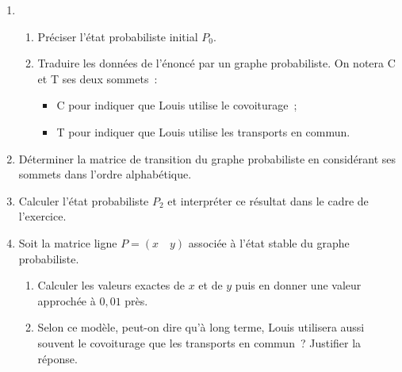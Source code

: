 \begin{enumerate}
     \item
     \begin{enumerate}[label=\alph*.]
          \item Préciser l'état probabiliste initial $P_0$.
          \item Traduire les données de l'énoncé par un graphe probabiliste.
          On notera \og C \fg{} et \og T \fg{} ses deux sommets~:
          \begin{itemize}
               \item \og C\fg{} pour indiquer que Louis utilise le covoiturage~;
               \item \og T\fg{} pour indiquer que Louis utilise les transports en commun.
          \end{itemize}
     \end{enumerate}
     \item  Déterminer la matrice de transition du graphe probabiliste en considérant ses sommets dans
     l'ordre alphabétique.
     \item  Calculer l'état probabiliste $P_2$ et interpréter ce résultat dans le cadre de l'exercice.
     \item  Soit la matrice ligne $P = (x \quad y)$ associée à l'état stable du graphe probabiliste.
     \begin{enumerate}[label=\alph*.]
          \item Calculer les valeurs exactes de $x$ et de $y$ puis en donner une valeur approchée à $0,01$ près.
          \item Selon ce modèle, peut-on dire qu'à long terme, Louis utilisera aussi souvent le covoiturage
          que les transports en commun~? Justifier la réponse.
     \end{enumerate}
\end{enumerate}
